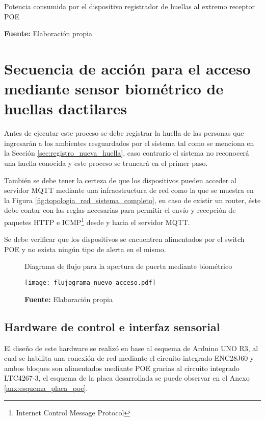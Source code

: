 \documentclass[../principal]{subfiles}
\begin{document}
  \begin{table}[H]
    \caption{Potencia consumida por el dispositivo registrador de huellas al extremo receptor POE}
    \centering
    
    \caption*{\textbf{Fuente:} Elaboración propia}
  \end{table}

  \section{Secuencia de acción para el acceso mediante sensor biométrico de huellas dactilares}

  Antes de ejecutar este proceso se debe registrar la huella de las personas que ingresarán a los ambientes resguardados por el sistema tal como se menciona en la Sección \ref{sec:registro_nueva_huella}, caso contrario el sistema no reconocerá una huella conocida y este proceso se truncará en el primer paso.

  También se debe tener la certeza de que los dispositivos pueden acceder al servidor MQTT mediante una infraestructura de red como la que se muestra en la Figura \ref{fig:topologia_red_sistema_completo}, en caso de existir un router, éste debe contar con las reglas necesarias para permitir el envío y recepción de paquetes HTTP e ICMP\footnote{Internet Control Message Protocol} desde y hacia el servidor MQTT.

  Se debe verificar que los dispositivos se encuentren alimentados por el switch POE y no exista ningún tipo de alerta en el mismo.

  \begin{figure}[H]
    \centering
    \caption{Diagrama de flujo para la apertura de puerta mediante biométrico}
    \texttt{[image: flujograma\_nuevo\_acceso.pdf]}
    \caption*{\textbf{Fuente:} Elaboración propia}
    \label{fig:flujo_acceso_biometrico}
  \end{figure}

  \subsection{Hardware de control e interfaz sensorial}

  El diseño de este hardware se realizó en base al esquema de Arduino UNO R3, al cual se habilita una conexión de red mediante el circuito integrado ENC28J60 y ambos bloques son alimentados mediante POE gracias al circuito integrado LTC4267-3, el esquema de la placa desarrollada se puede observar en el Anexo \ref{anx:esquema_placa_poe}.
\end{document}
